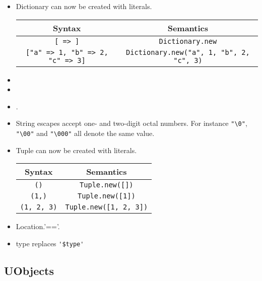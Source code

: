 \begin{itemize}
\item Dictionary can now be created with literals.

  \begin{center}
    \begin{tabular}{|c|c|}
      \hline
      Syntax & Semantics\\
      \hline
      \lstinline|[ => ]|
      &
      \lstinline|Dictionary.new|
      \\
      \lstinline|["a" => 1, "b" => 2, "c" => 3]|
      &
      \lstinline|Dictionary.new("a", 1, "b", 2, "c", 3)|
      \\
      \hline
    \end{tabular}
  \end{center}

\item {}
\item {}
\item {}.
\item String escapes accept one- and two-digit octal numbers.
  For instance \lstinline|"\0"|, \lstinline|"\00"| and
  \lstinline|"\000"| all denote the same value.

\item Tuple can now be created with literals.

  \begin{center}
    \begin{tabular}{|c|c|}
      \hline
      Syntax & Semantics\\
      \hline
      \lstinline|()|        & \lstinline|Tuple.new([])| \\
      \lstinline|(1,)|      & \lstinline|Tuple.new([1])| \\
      \lstinline|(1, 2, 3)| & \lstinline|Tuple.new([1, 2, 3])| \\
      \hline
    \end{tabular}
  \end{center}

\item Location.'=='.

\item type replaces \lstinline|'$type'| %
\end{itemize}

\subsection{UObjects}

